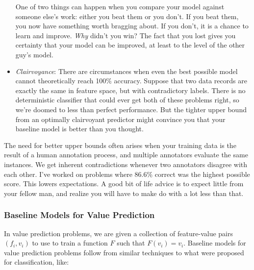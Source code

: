 \documentclass[10pt]{article}
\begin{document}
\begin{itemize}
  One of two things can happen when you compare your model against someone else’s work: either you beat them or you don’t. If you beat them, you now have something worth bragging about. If you don’t, it is a chance to learn and improve. \textit{Why} didn’t you win? The fact that you lost gives you certainty that your model can be improved, at least to the level of the other guy’s model.
  
  \item \textit{Clairvoyance}: There are circumstances when even the best possible model cannot theoretically reach 100\% accuracy. Suppose that two data records are exactly the same in feature space, but with contradictory labels. There is no deterministic classifier that could ever get both of these problems right, so we’re doomed to less than perfect performance. But the tighter upper bound from an optimally clairvoyant predictor might convince you that your baseline model is better than you thought.
\end{itemize}

The need for better upper bounds often arises when your training data is the result of a human annotation process, and multiple annotators evaluate the same instances. We get inherent contradictions whenever two annotators disagree with each other. I’ve worked on problems where 86.6\% correct was the highest possible score. This lowers expectations. A good bit of life advice is to expect little from your fellow man, and realize you will have to make do with a lot less than that.

\subsubsection{Baseline Models for Value Prediction}

In value prediction problems, we are given a collection of feature-value pairs \((f_{i}, v_{i})\) to use to train a function \(F\) such that \(F(v_{i})=v_{i}\). Baseline models for value prediction problems follow from similar techniques to what were proposed for classification, like:
\end{document}
